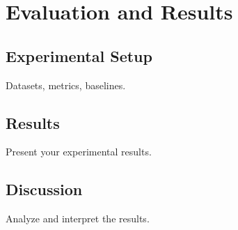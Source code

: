 \chapter{Evaluation and Results}
\label{ch:evaluation}

\section{Experimental Setup}

Datasets, metrics, baselines.

\section{Results}

Present your experimental results.

\section{Discussion}

Analyze and interpret the results.


